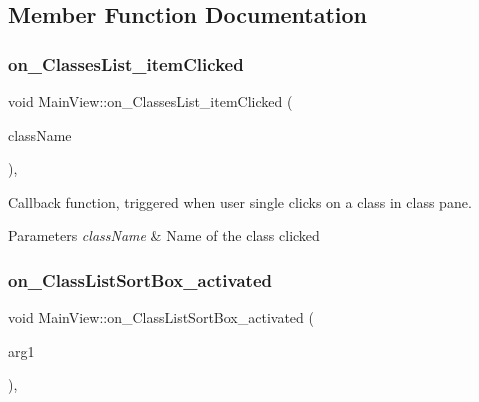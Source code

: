 \subsection{Member Function Documentation}
\mbox{\label{classMainView_a2970c289fed50a4d86051135af81ba61}} 
\subsubsection{\texorpdfstring{on\+\_\+\+Classes\+List\+\_\+item\+Clicked}{on\_ClassesList\_itemClicked}}
{\footnotesize\ttfamily void Main\+View\+::on\+\_\+\+Classes\+List\+\_\+item\+Clicked (\begin{DoxyParamCaption}\item[{Q\+List\+Widget\+Item $\ast$}]{class\+Name }\end{DoxyParamCaption})\hspace{0.3cm}{\ttfamily [private]}, {\ttfamily [slot]}}



Callback function, triggered when user single clicks on a class in class pane. 


\begin{DoxyParams}{Parameters}
{\em class\+Name} & Name of the class clicked \\
\hline
\end{DoxyParams}
\mbox{\label{classMainView_acf443010a1d872e9260e174a9311a1a0}} 
\subsubsection{\texorpdfstring{on\+\_\+\+Class\+List\+Sort\+Box\+\_\+activated}{on\_ClassListSortBox\_activated}}
{\footnotesize\ttfamily void Main\+View\+::on\+\_\+\+Class\+List\+Sort\+Box\+\_\+activated (\begin{DoxyParamCaption}\item[{const Q\+String \&}]{arg1 }\end{DoxyParamCaption})\hspace{0.3cm}{\ttfamily [private]}, {\ttfamily [slot]}}



